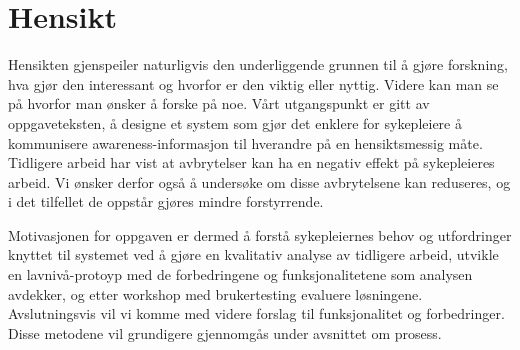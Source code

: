 \section{Hensikt}
\label{chp: hensikt}

Hensikten gjenspeiler naturligvis den underliggende grunnen til å gjøre forskning, hva gjør den interessant og hvorfor er den viktig eller nyttig. Videre kan man se på hvorfor man ønsker å forske på noe. Vårt utgangspunkt er gitt av oppgaveteksten, å designe et system som gjør det enklere for sykepleiere å kommunisere awareness-informasjon til hverandre på en hensiktsmessig måte. Tidligere arbeid har vist at avbrytelser kan ha en negativ effekt på sykepleieres arbeid. Vi ønsker derfor også å undersøke om disse avbrytelsene kan reduseres, og i det tilfellet de oppstår gjøres mindre forstyrrende. 

Motivasjonen for oppgaven er dermed å forstå sykepleiernes behov og utfordringer knyttet til systemet ved å gjøre en kvalitativ analyse av tidligere arbeid, utvikle en lavnivå-protoyp med de forbedringene og funksjonalitetene som analysen avdekker, og etter workshop med brukertesting evaluere løsningene. Avslutningsvis vil vi komme med videre forslag til funksjonalitet og forbedringer. Disse metodene vil grundigere gjennomgås under avsnittet om prosess. 